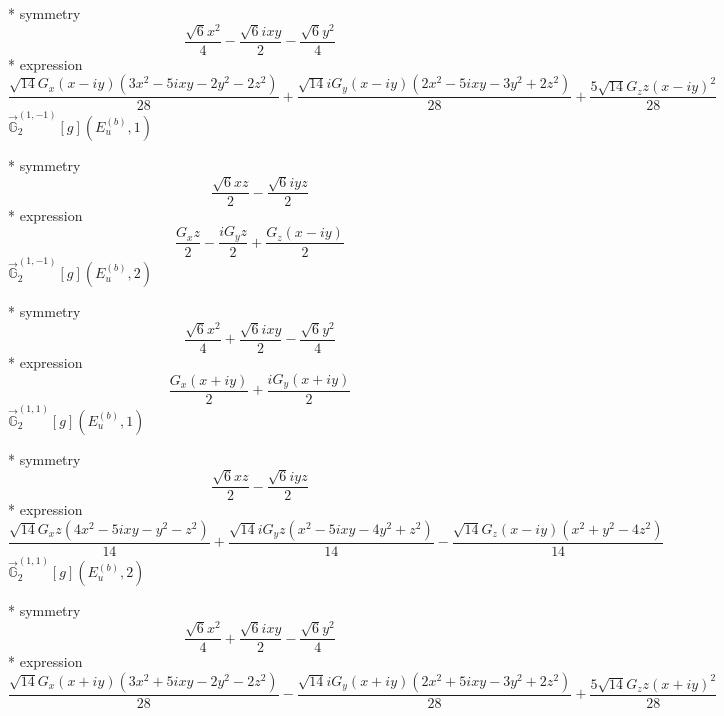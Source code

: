 \documentclass[fleqn,8pt]{jsarticle}
\begin{document}
\noindent\quad ** symmetry
\begin{dmath*}
\frac{\sqrt{6} x^{2}}{4} - \frac{\sqrt{6} i x y}{2} - \frac{\sqrt{6} y^{2}}{4}
\end{dmath*}
\noindent\quad ** expression
\begin{dmath*}
\frac{\sqrt{14} G_{x} \left(x - i y\right) \left(3 x^{2} - 5 i x y - 2 y^{2} - 2 z^{2}\right)}{28} + \frac{\sqrt{14} i G_{y} \left(x - i y\right) \left(2 x^{2} - 5 i x y - 3 y^{2} + 2 z^{2}\right)}{28} + \frac{5 \sqrt{14} G_{z} z \left(x - i y\right)^{2}}{28}
\end{dmath*}
\noindent\quad $\vec{\mathbb{G}}_{2}^{(1,-1)}[g](E_{u}^{(b)},1)$

\noindent\quad ** symmetry
\begin{dmath*}
\frac{\sqrt{6} x z}{2} - \frac{\sqrt{6} i y z}{2}
\end{dmath*}
\noindent\quad ** expression
\begin{dmath*}
\frac{G_{x} z}{2} - \frac{i G_{y} z}{2} + \frac{G_{z} \left(x - i y\right)}{2}
\end{dmath*}
\noindent\quad $\vec{\mathbb{G}}_{2}^{(1,-1)}[g](E_{u}^{(b)},2)$

\noindent\quad ** symmetry
\begin{dmath*}
\frac{\sqrt{6} x^{2}}{4} + \frac{\sqrt{6} i x y}{2} - \frac{\sqrt{6} y^{2}}{4}
\end{dmath*}
\noindent\quad ** expression
\begin{dmath*}
\frac{G_{x} \left(x + i y\right)}{2} + \frac{i G_{y} \left(x + i y\right)}{2}
\end{dmath*}
\noindent\quad $\vec{\mathbb{G}}_{2}^{(1,1)}[g](E_{u}^{(b)},1)$

\noindent\quad ** symmetry
\begin{dmath*}
\frac{\sqrt{6} x z}{2} - \frac{\sqrt{6} i y z}{2}
\end{dmath*}
\noindent\quad ** expression
\begin{dmath*}
\frac{\sqrt{14} G_{x} z \left(4 x^{2} - 5 i x y - y^{2} - z^{2}\right)}{14} + \frac{\sqrt{14} i G_{y} z \left(x^{2} - 5 i x y - 4 y^{2} + z^{2}\right)}{14} - \frac{\sqrt{14} G_{z} \left(x - i y\right) \left(x^{2} + y^{2} - 4 z^{2}\right)}{14}
\end{dmath*}
\noindent\quad $\vec{\mathbb{G}}_{2}^{(1,1)}[g](E_{u}^{(b)},2)$

\noindent\quad ** symmetry
\begin{dmath*}
\frac{\sqrt{6} x^{2}}{4} + \frac{\sqrt{6} i x y}{2} - \frac{\sqrt{6} y^{2}}{4}
\end{dmath*}
\noindent\quad ** expression
\begin{dmath*}
\frac{\sqrt{14} G_{x} \left(x + i y\right) \left(3 x^{2} + 5 i x y - 2 y^{2} - 2 z^{2}\right)}{28} - \frac{\sqrt{14} i G_{y} \left(x + i y\right) \left(2 x^{2} + 5 i x y - 3 y^{2} + 2 z^{2}\right)}{28} + \frac{5 \sqrt{14} G_{z} z \left(x + i y\right)^{2}}{28}
\end{dmath*}
\end{document}
